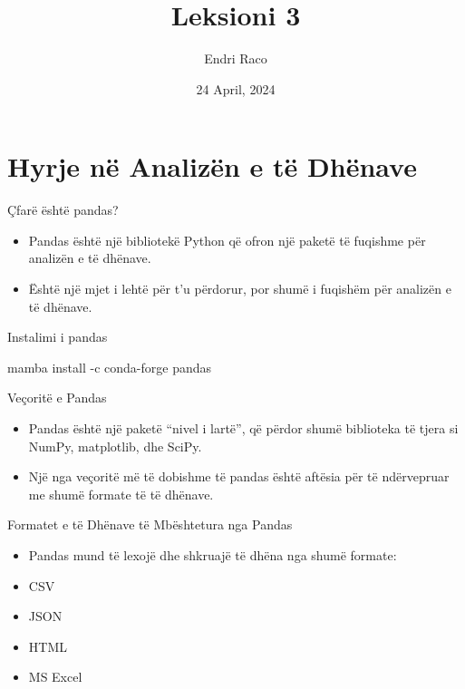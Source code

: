 \documentclass[
  ignorenonframetext,
]{beamer}
\title{Leksioni 3}
\author{Endri Raco}
\date{24 April, 2024}
\newenvironment{Shaded}{\begin{snugshade}}{\end{snugshade}}
\newcommand{\NormalTok}[1]{#1}
\begin{document}
\frame{\titlepage}

\begin{frame}[allowframebreaks]
  \tableofcontents[hideallsubsections]
\end{frame}
\hypertarget{hyrje-nuxeb-analizuxebn-e-tuxeb-dhuxebnave}{%
\section{Hyrje në Analizën e të
Dhënave}\label{hyrje-nuxeb-analizuxebn-e-tuxeb-dhuxebnave}}

\begin{frame}{Çfarë është pandas?}
\protect\hypertarget{uxe7faruxeb-uxebshtuxeb-pandas}{}
\begin{itemize}
\item
  Pandas është një bibliotekë Python që ofron një paketë të fuqishme për
  analizën e të dhënave.
\item
  Është një mjet i lehtë për t'u përdorur, por shumë i fuqishëm për
  analizën e të dhënave.
\end{itemize}
\end{frame}

\begin{frame}[fragile]{Instalimi i pandas}
\protect\hypertarget{instalimi-i-pandas}{}
\begin{Shaded}
\begin{Highlighting}[]
\NormalTok{mamba install {-}c conda{-}forge pandas}
\end{Highlighting}
\end{Shaded}
\end{frame}

\begin{frame}{Veçoritë e Pandas}
\protect\hypertarget{veuxe7orituxeb-e-pandas}{}
\begin{itemize}
\item
  Pandas është një paketë ``nivel i lartë'', që përdor shumë biblioteka
  të tjera si NumPy, matplotlib, dhe SciPy.
\item
  Një nga veçoritë më të dobishme të pandas është aftësia për të
  ndërvepruar me shumë formate të të dhënave.
\end{itemize}
\end{frame}

\begin{frame}{Formatet e të Dhënave të Mbështetura nga Pandas}
\protect\hypertarget{formatet-e-tuxeb-dhuxebnave-tuxeb-mbuxebshtetura-nga-pandas}{}
\begin{itemize}
\item
  Pandas mund të lexojë dhe shkruajë të dhëna nga shumë formate:
\item
  CSV
\item
  JSON
\item
  HTML
\item
  MS Excel
\end{itemize}
\end{frame}
\end{document}
